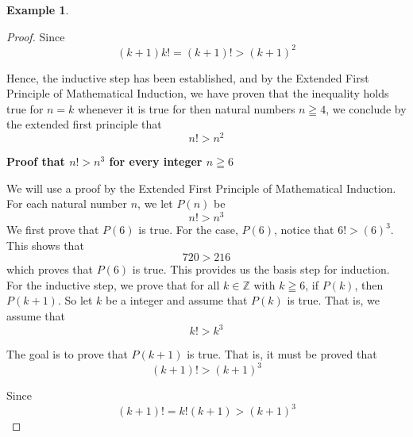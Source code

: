 \documentclass{book}
\theoremstyle{definition}
\newtheorem{example}{Example}[definition]
\theoremstyle{remark}
\newcommand{\bb}[1]{\mathbb{#1}}
\begin{document}
\begin{example}
\begin{proof}
           Since
                \begin{equation}
                    (k+1)k! = (k+1)! > (k+1)^2 
                \end{equation}
            
            Hence, the inductive step has been established, and by the Extended First Principle of Mathematical Induction, we have proven that the inequality holds true for $n=k$ whenever it is true for then natural numbers $n \geqq 4$, we conclude by the extended first principle that
                \begin{equation*}
                    n! > n^2
                \end{equation*}
    
    \begin{flushleft} \textbf{Proof that $n! > n^3$ for every integer $n \geqq 6$} \end{flushleft}
            We will use a proof by the Extended First Principle of Mathematical Induction. For each natural number $n$, we let $P(n)$ be
                \begin{equation*}
                    n! > n^3
                \end{equation*}
            We first prove that $P(6)$ is true. For the case, $P(6)$, notice that $6! > (6)^3$. This shows that   
                \begin{equation*}
                    720 > 216
                \end{equation*}
            which proves that $P(6)$ is true. This provides us the basis step for induction. \\ 
            
            For the inductive step, we prove that for all $k \in \bb{Z}$ with $k \geqq 6$, if $P(k)$, then $P(k+1)$. So let $k$ be a integer and assume that $P(k)$ is true. That is, we assume that 
                \begin{equation*}
                   k! > k^3
                \end{equation*}
            
            The goal is to prove that $P(k+1)$ is true. That is, it must be proved that  
                \begin{equation}
                    (k+1)! > (k+1)^3 
                \end{equation}
            
           Since
                \begin{equation}
                    (k+1)! = k!(k+1) > (k+1)^3 
                \end{equation}
            

\end{proof}
\end{example}
\end{document}
